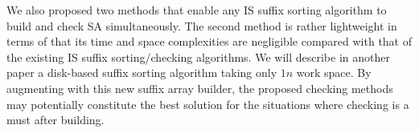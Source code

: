 \documentclass[10pt,journal,compsoc]{IEEEtran}
\begin{document}
We also proposed two methods that enable any IS suffix sorting algorithm to build and check SA simultaneously. The second method is rather lightweight in terms of that its time and space complexities are negligible compared with that of the existing IS suffix sorting/checking algorithms. We will describe in another paper a disk-based suffix sorting algorithm taking only $1n$ work space. By augmenting with this new suffix array builder, the proposed checking methods may potentially constitute the best solution for the situations where checking is a must after building.



\end{document}
